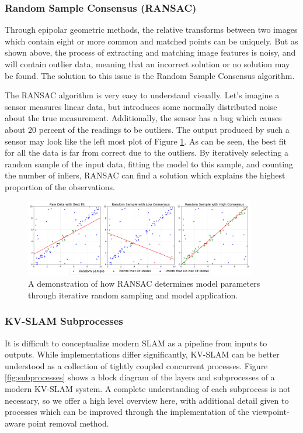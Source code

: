\subsubsection{Random Sample Consensus (RANSAC)}

Through epipolar geometric methods, the relative transforms between two images which contain eight or more common and matched points can be uniquely\cite{longuet-higginsComputerAlgorithmReconstructing1981}\cite{hartleyDefenseEightpointAlgorithm1997}. But as shown above, the process of extracting and matching image features is noisy, and will contain outlier data, meaning that an incorrect solution or no solution may be found. The solution to this issue is the Random Sample Consensus algorithm.

The RANSAC algorithm is very easy to understand visually. Let's imagine a sensor measures linear data, but introduces some normally distributed noise about the true measurement. Additionally, the sensor has a bug which causes about 20 percent of the readings to be outliers. The output produced by such a sensor may look like the left most plot of Figure \ref{fig:ransac}. As can be seen, the best fit for all the data is far from correct due to the outliers. By iteratively selecting a random sample of the input data, fitting the model to this sample, and counting the number of inliers, RANSAC can find a solution which explains the highest proportion of the observations.

\begin{figure}[!ht]
    \centering
    \includegraphics[width=0.9\textwidth]{resources/ransac.png}
    \caption[2D RANSAC Example]{A demonstration of how RANSAC determines model parameters through iterative random sampling and model application.}
    \label{fig:ransac}
\end{figure}

\subsubsection{KV-SLAM Subprocesses}

It is difficult to conceptualize modern SLAM as a pipeline from inputs to outputs. While implementations differ significantly, KV-SLAM can be better understood as a collection of tightly coupled concurrent processes. Figure \ref{fig:subprocesses} shows a block diagram of the layers and subprocesses of a modern KV-SLAM system. A complete understanding of each subprocess is not necessary, so we offer a high level overview here, with additional detail given to processes which can be improved through the implementation of the viewpoint-aware point removal method.

